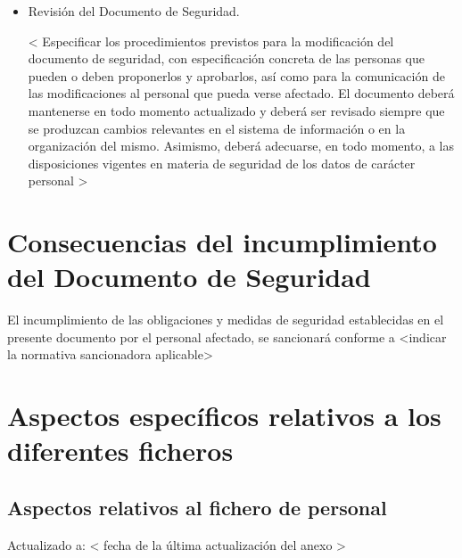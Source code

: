 \documentclass[a4paper,11pt,bibtotoc,noliststotoc]{scrbook}
\begin{document}
\begin{itemize}
\item Revisión del Documento de Seguridad.

< Especificar los procedimientos previstos para la modificación del documento de seguridad, con especificación concreta de las personas que pueden o deben proponerlos y aprobarlos, así como para la comunicación de las modificaciones al personal que pueda verse afectado.
El documento deberá mantenerse en todo momento actualizado y deberá ser revisado siempre que se produzcan cambios relevantes en el sistema de información o en la organización del mismo. Asimismo, deberá adecuarse, en todo momento, a las disposiciones vigentes en materia de seguridad de los datos de carácter personal >

\end{itemize}


\chapter{Consecuencias del incumplimiento del Documento de Seguridad}

El incumplimiento de las obligaciones y medidas de seguridad establecidas en el presente documento por el personal afectado, se sancionará conforme a <indicar la normativa sancionadora aplicable>





\appendix
\chapter{Aspectos específicos relativos a los diferentes ficheros}

\section{Aspectos relativos al fichero de personal}

Actualizado a: < fecha de la última actualización del anexo >
\end{document}
